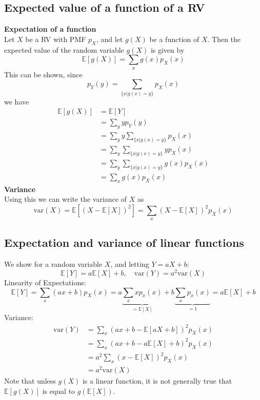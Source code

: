 \documentclass{report}
\begin{document}
\subsection{Expected value of a function of a RV}
\textbf{Expectation of a function}\\
Let $X$ be a RV with PMF $p_X$, and let $g(X)$ be a function of $X$. Then the expected value
of the random variable $g(X)$ is given by
\begin{equation*}
\boxed{\mathbb{E}[g(X)]=\sum_xg(x)p_X(x)}
\end{equation*}
This can be shown, since
\begin{equation*}
p_Y(y)=\sum_{\{x|g(x)=y\}}p_X(x)
\end{equation*}
we have
\begin{align*}
\mathbb{E}[g(X)]&=\mathbb{E}[Y]\\
&=\sum_yyp_Y(y)\\
&=\sum_yy\sum_{\{x|g(x)=y\}}p_X(x)\\
&=\sum_y\sum_{\{x|g(x)=y\}}yp_X(x)\\
&=\sum_y\sum_{\{x|g(x)=y\}}g(x)p_X(x)\\
&=\sum_xg(x)p_X(x)
\end{align*}
\textbf{Variance}\\
Using this we can write the variance of $X$ as
\begin{equation*}
\text{var}(X)=\mathbb{E}\left[(X-\mathbb{E}[X])^2\right]
=\sum_x(X-\mathbb{E}[X])^2p_X(x)
\end{equation*}
\newpage

\subsection{Expectation and variance of linear functions}
We show for a random variable $X$, and letting $Y=aX+b$:
\begin{equation*}
\boxed{\mathbb{E}[Y]=a\mathbb{E}[X]+b,\quad
\text{var}(Y)=a^2\text{var}(X)}
\end{equation*}
Linearity of Expectations:
\begin{equation*}
\mathbb{E}[Y]=\sum_x(ax+b)p_X(x)=a\underbrace{\sum_xxp_x(x)}_{=\mathbb{E}[X]}+b\underbrace{\sum_xp_x(x)}_{=1}
=a\mathbb{E}[X]+b
\end{equation*}
Variance:
\begin{align*}
\text{var}(Y)&=\sum_x(ax+b-\mathbb{E}[aX+b])^2p_X(x)\\
&=\sum_x(ax+b-a\mathbb{E}[X]+b)^2p_X(x)\\
&=a^2\sum_x(x-\mathbb{E}[X])^2p_X(x)\\
&=a^2\text{var}(X)
\end{align*}
Note that unless $g(X)$ is a linear function, it is not generally true that $\mathbb{E}[g(X)]$ is equal to 
$g(\mathbb{E}[X])$.
\end{document}
